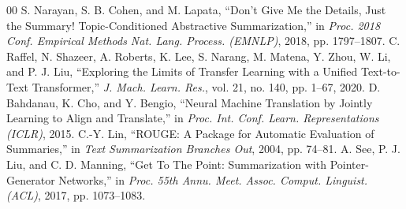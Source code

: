 \documentclass[conference]{IEEEtran}
\begin{document}
\begin{thebibliography}{00}
 S. Narayan, S. B. Cohen, and M. Lapata, ``Don't Give Me the Details, Just the Summary! Topic-Conditioned Abstractive Summarization,'' in \textit{Proc. 2018 Conf. Empirical Methods Nat. Lang. Process. (EMNLP)}, 2018, pp. 1797--1807.
 C. Raffel, N. Shazeer, A. Roberts, K. Lee, S. Narang, M. Matena, Y. Zhou, W. Li, and P. J. Liu, ``Exploring the Limits of Transfer Learning with a Unified Text-to-Text Transformer,'' \textit{J. Mach. Learn. Res.}, vol. 21, no. 140, pp. 1--67, 2020.
 D. Bahdanau, K. Cho, and Y. Bengio, ``Neural Machine Translation by Jointly Learning to Align and Translate,'' in \textit{Proc. Int. Conf. Learn. Representations (ICLR)}, 2015.
 C.-Y. Lin, ``ROUGE: A Package for Automatic Evaluation of Summaries,'' in \textit{Text Summarization Branches Out}, 2004, pp. 74--81.
 A. See, P. J. Liu, and C. D. Manning, ``Get To The Point: Summarization with Pointer-Generator Networks,'' in \textit{Proc. 55th Annu. Meet. Assoc. Comput. Linguist. (ACL)}, 2017, pp. 1073--1083.
\end{thebibliography}
\end{document}

